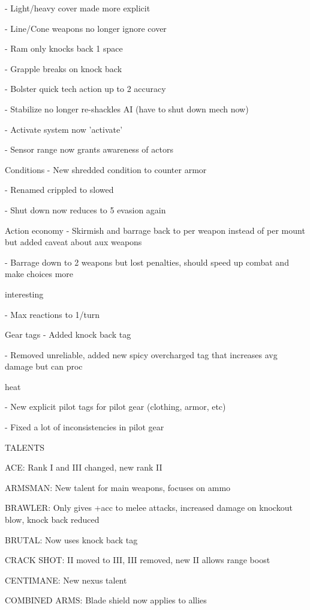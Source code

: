      -   Light/heavy cover made more explicit
 

     -   Line/Cone weapons no longer ignore cover
 
     -   Ram only knocks back 1 space
 
     -   Grapple breaks on knock back
 

     -   Bolster quick tech action up to 2 accuracy
 
     -   Stabilize no longer re-shackles AI (have to shut down mech now)
 
     -   Activate system now 'activate'
 

     -   Sensor range now grants awareness of actors
 

Conditions  
     -   New shredded condition to counter armor
 
     -   Renamed crippled to slowed
 

     -   Shut down now reduces to 5 evasion again
 

Action economy  
     -   Skirmish and barrage back to per weapon instead of per mount but added caveat about aux  
         weapons
 
     -   Barrage down to 2 weapons but lost penalties, should speed up combat and make choices more  

         interesting
 
     -   Max reactions to 1/turn
 

Gear tags  
     -   Added knock back tag
 
     -   Removed unreliable, added new spicy overcharged tag that increases avg damage but can proc  

         heat
 
     -   New explicit pilot tags for pilot gear (clothing, armor, etc)
 
     -   Fixed a lot of inconsistencies in pilot gear
 

TALENTS  

ACE: Rank I and III changed, new rank II
 

ARMSMAN: New talent for main weapons, focuses on ammo
 
BRAWLER:  Only gives +acc to melee attacks, increased damage on knockout blow, knock back reduced
 
BRUTAL: Now uses knock back tag
 

CRACK SHOT:  II moved to III, III removed, new II allows range boost
 
CENTIMANE: New nexus talent
 

COMBINED ARMS: Blade shield now applies to allies
 
